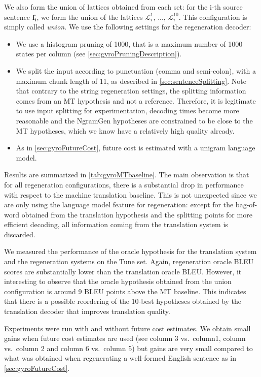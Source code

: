 We also form the union of lattices
obtained from each set:
for the i-th source sentence $\bm{f_i}$, we form the union
of the lattices $\mathcal{L}_i^1$, ..., $\mathcal{L}_i^{10}$.
This configuration is simply
called \emph{union}.
We use the following settings for the regeneration decoder:
%
\begin{itemize}
  \item We use a histogram pruning of 1000, that is a maximum number of 1000 states
    per column (see \autoref{sec:gyroPruningDescription}).
  \item We split the input according to punctuation (comma and semi-colon), with
    a maximum chunk length of 11, as described in \autoref{sec:sentenceSplitting}.
    Note that contrary to the string regeneration settings, the splitting information
    comes from an MT hypothesis and not a reference. Therefore, it is legitimate
    to use input splitting for experimentation, decoding times become more
    reasonable and the NgramGen hypotheses are constrained to be close to
    the MT hypotheses, which we know have a relatively high quality already.
  \item As in \autoref{sec:gyroFutureCost}, future cost is estimated with a unigram language model.
\end{itemize}
%
Results are summarized in \autoref{tab:gyroMTbaseline}.
The main observation is that for all regeneration configurations, there
is a substantial drop in performance with respect
to the machine translation baseline. This is not unexpected
since we are only using the language model feature for regeneration:
except for the bag-of-word obtained from the translation hypothesis and
the splitting points for more efficient decoding, all information coming from the translation system
is discarded.

We measured the performance of the oracle hypothesis %
for the translation system and the regeneration systems on the Tune set.
Again, regeneration oracle BLEU scores are substantially
lower than the translation oracle BLEU.
However, it interesting to observe that
the oracle hypothesis obtained from the union configuration is
around 9 BLEU points above the MT baseline. This indicates that
there is a possible reordering of the 10-best hypotheses obtained by
the translation decoder that improves translation quality.

Experiments were run with and without future cost estimates.
We obtain small gains when future cost estimates are used (see column 3 vs.\ column1,
column vs.\ column 2 and column 6 vs.\ column 5)
but gains are very small compared to what was obtained
when regenerating a well-formed English sentence as in \autoref{sec:gyroFutureCost}.

